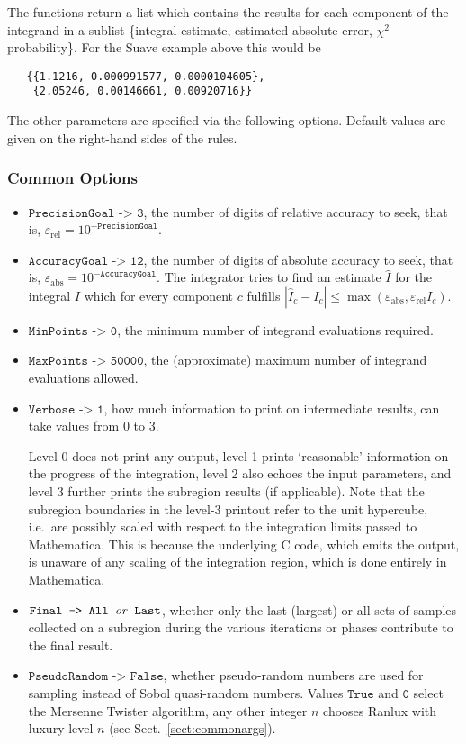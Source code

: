 \documentclass[12pt]{article}
\newcommand\ie{i.e.\ }
\newcommand\epsabs{\varepsilon_{\text{abs}}}
\newcommand\epsrel{\varepsilon_{\text{rel}}}
\newcommand\Code[1]{\ensuremath{\texttt{#1}}}
\newcommand\Var[1]{\ensuremath{\mathit{#1}}}
\newcommand\Option[2]{\item\Code{#1 -> #2},}
\begin{document}
The functions return a list which contains the results for each
component of the integrand in a sublist \{integral estimate, estimated 
absolute error, $\chi^2$ probability\}.  For the Suave example above 
this would be
\begin{verbatim}
   {{1.1216, 0.000991577, 0.0000104605}, 
    {2.05246, 0.00146661, 0.00920716}}
\end{verbatim}
The other parameters are specified via the following options.  Default 
values are given on the right-hand sides of the rules.


\subsubsection{Common Options}

\begin{itemize}
\Option{PrecisionGoal}{3}
the number of digits of relative accuracy to seek, that is, $\epsrel =
10^{-\Code{PrecisionGoal}}$.

\Option{AccuracyGoal}{12}
the number of digits of absolute accuracy to seek, that is, $\epsabs =
10^{-\Code{AccuracyGoal}}$.  The integrator tries to find an estimate
$\hat I$ for the integral $I$ which for every component $c$ fulfills
$|\hat I_c - I_c|\leqslant \max(\epsabs, \epsrel I_c)$.

\Option{MinPoints}{0}
the minimum number of integrand evaluations required.

\Option{MaxPoints}{50000}
the (approximate) maximum number of integrand evaluations allowed.

\Option{Verbose}{1}
how much information to print on intermediate results, can take values
from 0 to 3.

Level 0 does not print any output, level 1 prints `reasonable'
information on the progress of the integration, level 2 also echoes the
input parameters, and level 3 further prints the subregion results (if
applicable).  Note that the subregion boundaries in the level-3 printout
refer to the unit hypercube, \ie are possibly scaled with respect to the
integration limits passed to Mathematica.  This is because the
underlying C code, which emits the output, is unaware of any scaling of
the integration region, which is done entirely in Mathematica.

\Option{Final}{All \Var{or} Last}
whether only the last (largest) or all sets of samples collected on a
subregion during the various iterations or phases contribute to the
final result.

\Option{PseudoRandom}{False}
whether pseudo-random numbers are used for sampling instead of Sobol
quasi-random numbers.  Values \Code{True} and \Code{0} select the
Mersenne Twister algorithm, any other integer $n$ chooses Ranlux with
luxury level $n$ (see Sect.~\ref{sect:commonargs}).


\end{itemize}
\end{document}

